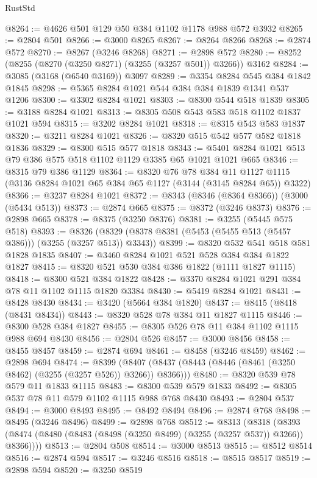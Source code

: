 \begin{lexlean}{RustStd}
\begin{coremodule}
{\begin{coremodule}
{{{{{{{{{{{{{{{{{{{{{{{{{{@8264 := @4626 @501 @129 @50 @384 @1102 @1178 @988 @572 @3932
@8265 := @2804 @501
@8266 := @3000 @8265
@8267 := @8264 @8266
@8268 := @2874 @572
@8270 := @8267 (@3246 @8268)
@8271 := @2898 @572
@8280 := @8252 (@8255 (@8270 (@3250 @8271) (@3255 (@3257 @501)) @3266)) @3162
@8284 := @3085 (@3168 (@6540 @3169)) @3097
@8289 := @3354 @8284 @545 @384 @1842 @1845
@8298 := @5365 @8284 @1021 @544 @384 @384 @1839 @1341 @537 @1206
@8300 := @3302 @8284 @1021
@8303 := @8300 @544 @518 @1839
@8305 := @3188 @8284 @1021
@8313 := @8305 @508 @543 @583 @518 @1102 @1837 @1021 @594
@8315 := @3202 @8284 @1021
@8318 := @8315 @543 @583 @1837
@8320 := @3211 @8284 @1021
@8326 := @8320 @515 @542 @577 @582 @1818 @1836
@8329 := @8300 @515 @577 @1818
@8343 := @5401 @8284 @1021 @513 @79 @386 @575 @518 @1102 @1129 @3385 @65 @1021 @1021 @665
@8346 := @8315 @79 @386 @1129
@8364 := @8320
    @76
    @78
    @384
    @11
    @1127
    @1115
    (@3136 @8284 @1021 @65 @384 @65 @1127 (@3144 (@3145 @8284 @65)) @3322)
@8366 := @3237 @8284 @1021
@8372 := @8343 (@8346 (@8364 @8366)) (@3000 (@5434 @513))
@8373 := @2874 @665
@8375 := @8372 (@3246 @8373)
@8376 := @2898 @665
@8378 := @8375 (@3250 @8376)
@8381 := @3255 (@5445 @575 @518)
@8393 := @8326 (@8329 (@8378 @8381 (@5453 (@5455 @513 (@5457 @386))) (@3255 (@3257 @513)) @3343))
@8399 := @8320 @532 @541 @518 @581 @1828 @1835
@8407 := @3460 @8284 @1021 @521 @528 @384 @384 @1822 @1827
@8415 := @8320 @521 @530 @384 @386 @1822 (@1111 @1827 @1115)
@8418 := @8300 @521 @384 @1822
@8428 := @3370 @8284 @1021 @291 @384 @78 @11 @1102 @1115 @1820 @3384
@8430 := @5419 @8284 @1021
@8431 := @8428 @8430
@8434 := @3420 (@5664 @384 @1820)
@8437 := @8415 (@8418 (@8431 @8434))
@8443 := @8320 @528 @78 @384 @11 @1827 @1115
@8446 := @8300 @528 @384 @1827
@8455 := @8305 @526 @78 @11 @384 @1102 @1115 @988 @694 @8430
@8456 := @2804 @526
@8457 := @3000 @8456
@8458 := @8455 @8457
@8459 := @2874 @694
@8461 := @8458 (@3246 @8459)
@8462 := @2898 @694
@8474 := @8399
    (@8407 (@8437 (@8443 (@8446 (@8461 (@3250 @8462) (@3255 (@3257 @526)) @3266)) @8366)))
@8480 := @8320 @539 @78 @579 @11 @1833 @1115
@8483 := @8300 @539 @579 @1833
@8492 := @8305 @537 @78 @11 @579 @1102 @1115 @988 @768 @8430
@8493 := @2804 @537
@8494 := @3000 @8493
@8495 := @8492 @8494
@8496 := @2874 @768
@8498 := @8495 (@3246 @8496)
@8499 := @2898 @768
@8512 := @8313
    (@8318 (@8393 (@8474 (@8480 (@8483 (@8498 (@3250 @8499) (@3255 (@3257 @537)) @3266)) @8366))))
@8513 := @2804 @508
@8514 := @3000 @8513
@8515 := @8512 @8514
@8516 := @2874 @594
@8517 := @3246 @8516
@8518 := @8515 @8517
@8519 := @2898 @594
@8520 := @3250 @8519
}}}}}}}}}}}}}}}}}}}}}}}}}}
\end{coremodule}}
\end{coremodule}
\end{lexlean}
